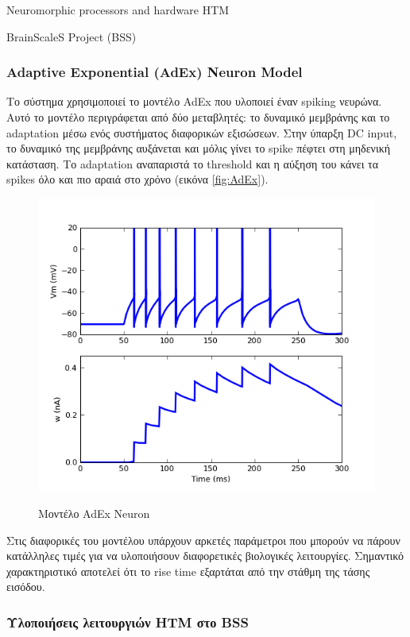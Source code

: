 \documentclass[a4paper,11pt]{article}
\begin{document}
\begin{section}{Neuromorphic processors and hardware HTM}
\begin{subsection}{BrainScaleS Project (BSS)}
    \subsubsection{Adaptive Exponential (AdEx) Neuron Model}

    Το σύστημα χρησιμοποιεί το μοντέλο AdEx που υλοποιεί έναν spiking νευρώνα. Αυτό το μοντέλο περιγράφεται από δύο μεταβλητές: το δυναμικό μεμβράνης και το adaptation μέσω ενός συστήματος διαφορικών εξισώσεων. Στην ύπαρξη DC input, το δυναμικό της μεμβράνης αυξάνεται και μόλις γίνει το spike πέφτει στη μηδενική κατάσταση. Το adaptation αναπαριστά το threshold και η αύξηση του κάνει τα spikes όλο και πιο αραιά στο χρόνο (εικόνα \eqref{fig:AdEx}).
    \begin{figure}[H]
      \centering%
      {\includegraphics[width=0.45\columnwidth,clip=true]{pics/adex.jpg}}
      \caption{Μοντέλο AdEx Neuron} \label{fig:AdEx}
    \end{figure}
    Στις διαφορικές του μοντέλου υπάρχουν αρκετές παράμετροι που μπορούν να πάρουν κατάλληλες τιμές για να υλοποιήσουν διαφορετικές βιολογικές λειτουργίες. Σημαντικό χαρακτηριστικό αποτελεί ότι το rise time εξαρτάται από την στάθμη της τάσης εισόδου.

    \subsubsection{Υλοποιήσεις λειτουργιών HTM στο BSS}


\end{subsection}
\end{section}
\end{document}
